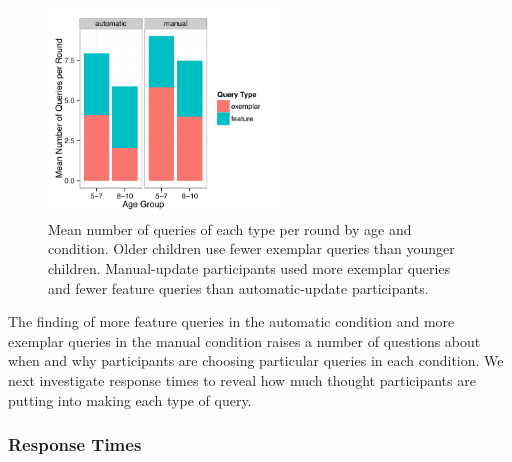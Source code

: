 \documentclass[man,floatsintext]{apa6}
\begin{document}
\begin{figure}[h]
  \centering
  \includegraphics[width=0.55\textwidth]{figures/clicks_by_ageGroup_condition_query_type}
  \caption{Mean number of queries of each type per round by age and condition. Older children use fewer exemplar queries than younger children. Manual-update participants used more exemplar queries and fewer feature queries than automatic-update participants.}
  \label{fig:clicks-per-agecond}
\end{figure} 

The finding of more feature queries in the automatic condition and more exemplar queries in the manual condition raises a number of questions about when and why participants are choosing particular queries in each condition. We next investigate response times to reveal how much thought participants are putting into making each type of query.

  
 
\subsubsection{Response Times}
\end{document}

